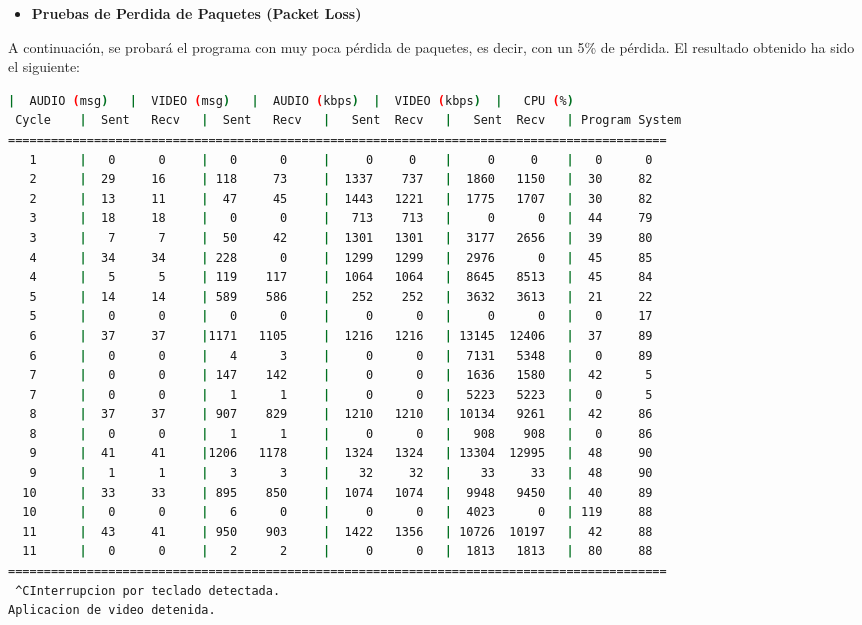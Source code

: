 \begin{itemize}
    \item \textbf{Pruebas de Perdida de Paquetes (Packet Loss)}
\end{itemize}

A continuación, se probará el programa con muy poca pérdida de paquetes, es decir, con un 5\% de pérdida. El resultado obtenido ha sido el siguiente:
\vspace{\baselineskip}

\begin{adjustbox}{max width=\textwidth}
\begin{lstlisting}[language=bash,basicstyle=\ttfamily\scriptsize]
          |  AUDIO (msg)   |  VIDEO (msg)   |  AUDIO (kbps)  |  VIDEO (kbps)  |   CPU (%)
 Cycle    |  Sent   Recv   |  Sent   Recv   |   Sent  Recv   |   Sent  Recv   | Program System
============================================================================================
   1      |   0      0     |   0      0     |     0     0    |     0     0    |   0      0
   2      |  29     16     | 118     73     |  1337    737   |  1860   1150   |  30     82
   2      |  13     11     |  47     45     |  1443   1221   |  1775   1707   |  30     82
   3      |  18     18     |   0      0     |   713    713   |     0      0   |  44     79
   3      |   7      7     |  50     42     |  1301   1301   |  3177   2656   |  39     80
   4      |  34     34     | 228      0     |  1299   1299   |  2976      0   |  45     85
   4      |   5      5     | 119    117     |  1064   1064   |  8645   8513   |  45     84
   5      |  14     14     | 589    586     |   252    252   |  3632   3613   |  21     22
   5      |   0      0     |   0      0     |     0      0   |     0      0   |   0     17
   6      |  37     37     |1171   1105     |  1216   1216   | 13145  12406   |  37     89
   6      |   0      0     |   4      3     |     0      0   |  7131   5348   |   0     89
   7      |   0      0     | 147    142     |     0      0   |  1636   1580   |  42      5
   7      |   0      0     |   1      1     |     0      0   |  5223   5223   |   0      5
   8      |  37     37     | 907    829     |  1210   1210   | 10134   9261   |  42     86
   8      |   0      0     |   1      1     |     0      0   |   908    908   |   0     86
   9      |  41     41     |1206   1178     |  1324   1324   | 13304  12995   |  48     90
   9      |   1      1     |   3      3     |    32     32   |    33     33   |  48     90
  10      |  33     33     | 895    850     |  1074   1074   |  9948   9450   |  40     89
  10      |   0      0     |   6      0     |     0      0   |  4023      0   | 119     88
  11      |  43     41     | 950    903     |  1422   1356   | 10726  10197   |  42     88
  11      |   0      0     |   2      2     |     0      0   |  1813   1813   |  80     88
============================================================================================
 ^CInterrupcion por teclado detectada.
Aplicacion de video detenida.


\end{lstlisting}
\end{adjustbox}
